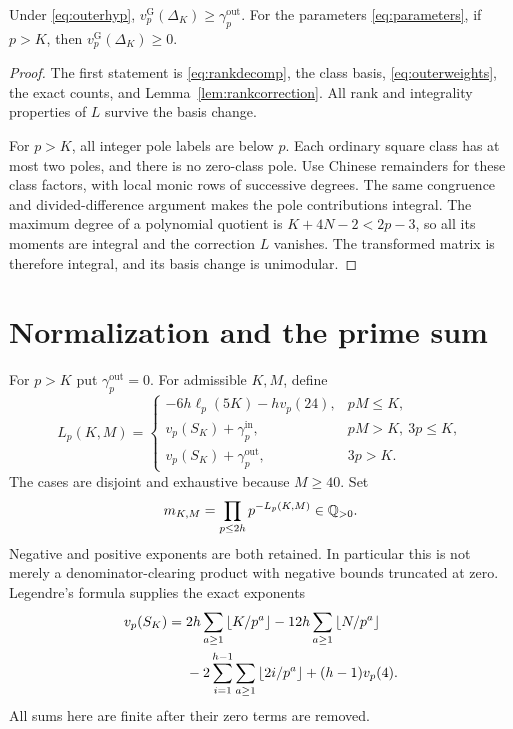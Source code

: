 \begin{proposition}
\label{prop:outer}
Under \eqref{eq:outerhyp},
$v_p^{\mathrm G}(\Delta_K)\ge\gamma_p^{\mathrm{out}}$.
For the parameters \eqref{eq:parameters}, if $p>K$, then
$v_p^{\mathrm G}(\Delta_K)\ge0$.
\end{proposition}
\begin{proof}
The first statement is \eqref{eq:rankdecomp}, the class basis,
\eqref{eq:outerweights}, the exact counts, and
Lemma~\ref{lem:rankcorrection}. All rank and integrality properties of
$L$ survive the basis change.

For $p>K$, all integer pole labels are below $p$. Each ordinary square
class has at most two poles, and there is no zero-class pole. Use
Chinese remainders for these class factors, with local monic rows of
successive degrees. The same congruence and divided-difference argument
makes the pole contributions integral. The maximum degree of a
polynomial quotient is $K+4N-2<2p-3$, so all its moments are integral
and the correction $L$ vanishes. The transformed matrix is therefore
integral, and its basis change is unimodular.
\end{proof}

\section{Normalization and the prime sum}
\label{sec:normalization}
For $p>K$ put $\gamma_p^{\mathrm{out}}=0$. For admissible $K,M$, define
\begin{equation}\label{eq:Lp}
 L_p(K,M)=\begin{cases}
 -6h\ell_p(5K)-h v_p(24),&pM\le K,\\
 v_p(S_K)+\gamma_p^{\mathrm{in}},&pM>K,\ 3p\le K,\\
 v_p(S_K)+\gamma_p^{\mathrm{out}},&3p>K.
 \end{cases}
\end{equation}
The cases are disjoint and exhaustive because $M\ge40$. Set
\begin{equation}\label{eq:mdef}
 m_{K,M}=\prod_{p\le2h}p^{-L_p(K,M)}\in\mathbb Q_{>0}.
\end{equation}
Negative and positive exponents are both retained. In particular this
is not merely a denominator-clearing product with negative bounds
truncated at zero. Legendre's formula supplies the exact exponents
\begin{equation}\label{eq:scalarvaluation}
\begin{split}
 v_p(S_K)={}&2h\sum_{a\ge1}\left\lfloor K/p^a\right\rfloor
 -12h\sum_{a\ge1}\left\lfloor N/p^a\right\rfloor\\
 &-2\sum_{i=1}^{h-1}\sum_{a\ge1}\left\lfloor 2i/p^a\right\rfloor
 +(h-1)v_p(4).
\end{split}
\end{equation}
All sums here are finite after their zero terms are removed.

